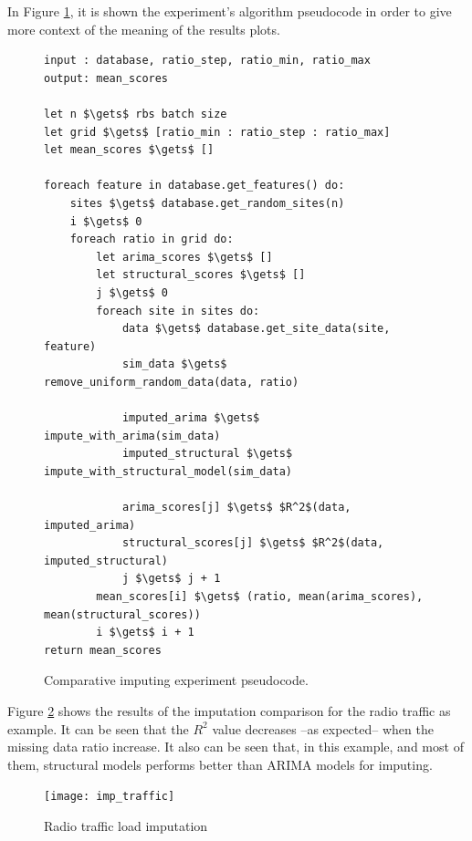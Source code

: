 In Figure \ref{alg:imputing_exp}, it is shown the experiment's algorithm pseudocode in order to give more context of the meaning of the results plots.

\begin{figure}[hptb]
\begin{lstlisting}[keywords={,let, input, output, return, datatype, function, in, if, else, foreach, while, begin, end, do, }, mathescape=true, tabsize=4, basicstyle=\ttfamily\small]
input : database, ratio_step, ratio_min, ratio_max
output: mean_scores

let n $\gets$ rbs batch size
let grid $\gets$ [ratio_min : ratio_step : ratio_max]
let mean_scores $\gets$ []

foreach feature in database.get_features() do:
	sites $\gets$ database.get_random_sites(n)
	i $\gets$ 0
	foreach ratio in grid do:
		let arima_scores $\gets$ []
		let structural_scores $\gets$ []
		j $\gets$ 0
		foreach site in sites do:
			data $\gets$ database.get_site_data(site, feature)
			sim_data $\gets$ remove_uniform_random_data(data, ratio)
			
			imputed_arima $\gets$ impute_with_arima(sim_data)
			imputed_structural $\gets$ impute_with_structural_model(sim_data)
			
			arima_scores[j] $\gets$ $R^2$(data, imputed_arima)
			structural_scores[j] $\gets$ $R^2$(data, imputed_structural)
			j $\gets$ j + 1
		mean_scores[i] $\gets$ (ratio, mean(arima_scores), mean(structural_scores))
		i $\gets$ i + 1
return mean_scores
\end{lstlisting}
\caption{Comparative imputing experiment pseudocode.}
\label{alg:imputing_exp}
\end{figure}

\pagebreak

Figure \ref{fig:imp_exp_good} shows the results of the imputation comparison for the radio traffic as example. It can be seen that the $R^2$ value decreases --as expected-- when the missing data ratio increase. It also can be seen that, in this example, and most of them, structural models performs better than ARIMA models for imputing.

\begin{figure}[hptb]
	\centering
	\texttt{[image: imp\_traffic]}
	\caption{Radio traffic load imputation}
	\label{fig:imp_exp_good}
\end{figure}



